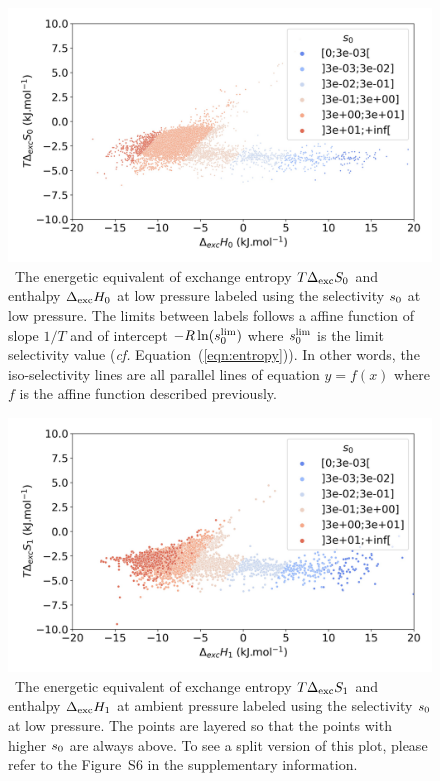 \documentclass[main]{subfiles}
\begin{document}
  
  \begin{figure}[t]
  \centering
    \includegraphics[width=\linewidth]{figures/2-thermo/enthalpy_entropy_0_s_0.jpg}
    \caption{\ The energetic equivalent of exchange entropy $T\Delta_{\text{exc}}S_{\text{0}}$ and enthalpy $\Delta_{\text{exc}}H_{\text{0}}$ at low pressure labeled using the selectivity $s_{\text{0}}$ at low pressure. The limits between labels follows a affine function of slope $1/T$ and of intercept $-R\ln(s_{\text{0}}^{\text{lim}})$ where $s_{\text{0}}^{\text{lim}}$ is the limit selectivity value (\emph{cf.} Equation~(\ref{eqn:entropy})). In other words, the iso-selectivity lines are all parallel lines of equation $y=f(x)$ where $f$ is the affine function described previously.}
    \label{fgr:HSplot_0}
  \end{figure}
  
  
  \begin{figure}[t]
  \centering
    \includegraphics[width=\linewidth]{figures/2-thermo/enthalpy_entropy_2080_s_0.jpg}
    \caption{\ The energetic equivalent of exchange entropy $T\Delta_{\text{exc}}S_{\text{1}}$ and enthalpy $\Delta_{\text{exc}}H_{\text{1}}$ at ambient pressure labeled using the selectivity $s_{\text{0}}$ at low pressure. The points are layered so that the points with higher $s_{\text{0}}$ are always above. To see a split version of this plot, please refer to the Figure~S6 in the supplementary information.}
    \label{fgr:HSplot_1}
  \end{figure}
  
\end{document}
